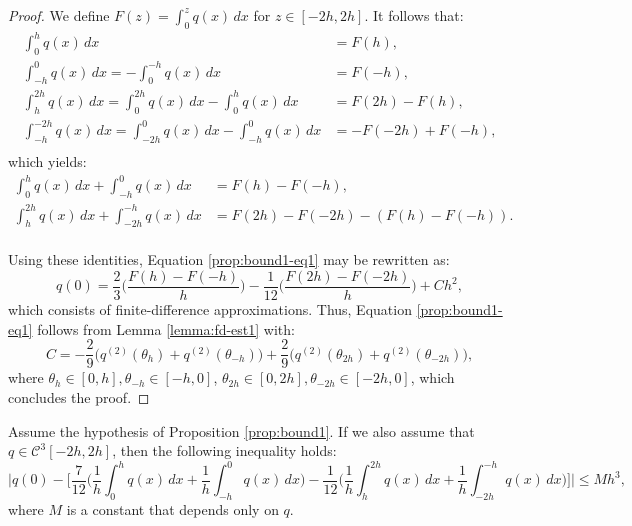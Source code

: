 \begin{proof}
	We define $F(z) = \int_{0}^{z} q(x) \,dx $ for $z \in [-2h, 2h]$. 
	It follows that:
	\begin{align*}
		\int_{ 0}^{h}   q(x) \,dx &= F(h),\\
		\int_{-h}^{0}   q(x) \,dx = -\int_{ 0}^{-h} q(x)  \,dx  &= F(-h),\\ 
		\int_{ h}^{2h}  q(x) \,dx =  \int_{ 0}^{2h} q(x)  \,dx - \int_{ 0}^{h} q(x) \,dx  &= F(2h) - F(h),\\ 
		\int_{-h}^{-2h} q(x) \,dx =  \int_{-2h }^{0} q(x) \,dx - \int_{-h}^{0} q(x) \,d x&= -F(-2h) + F(-h),\\ 
	\end{align*}
	which yields:
	\begin{align*}
		\int_{0}^{h} q(x) \,dx + \int_{-h}^{0} q(x) \,dx &=
		F(h) - F(-h), \\
		\int_{h}^{2h} q(x) \,dx + \int_{-2h}^{-h} q(x) \,dx &=
		F(2h) - F(-2h) - (F(h) - F(-h)). \\
	\end{align*}
	
	Using these identities, Equation \eqref{prop:bound1-eq1} may be rewritten as:
	\begin{equation}
		\label{prop:bound1-eq2}
		q(0) = \frac{2}{3} \bigg(\frac{F(h) - F(-h)}{h}\bigg)
		       - \frac{1}{12} \bigg(\frac{F(2h) - F(-2h)}{h}\bigg)
+ Ch^2,
	\end{equation}
	which consists of finite-difference approximations. 
	Thus, Equation \eqref{prop:bound1-eq1} follows from Lemma \ref{lemma:fd-est1}
	with:
	\begin{equation}
		\label{prop:bound1-eq3}
		C = -\frac{2}{9}\bigg( q^{(2)}(\theta_{h}) + q^{(2)}(\theta_{-h})\bigg)
		+ \frac{2}{9}\bigg( q^{(2)}(\theta_{2h}) + q^{(2)}(\theta_{-2h})\bigg), 
	\end{equation}
	where $\theta_{h} \in [0,h], \theta_{-h}\in [-h,0]$, 
	$\theta_{2h} \in [0,2h], \theta_{-2h}\in [-2h,0]$,
	which concludes the proof.

  \renewcommand\qedsymbol{} %
\end{proof}

\begin{prop}
	\label{prop:bound2}
	Assume the hypothesis of Proposition \ref{prop:bound1}. If we also assume that
	$q \in \mathcal{C}^{3}[-2h,2h]$, then the following inequality holds:
	\begin{equation}
                \label{prop:bound2-eq1}
		\bigg|q(0) - \bigg[\frac{7}{12}\bigg( \frac{1}{h} \int_{0}^{h} q(x) \,dx
                       + \frac{1}{h} \int_{-h}^{0} q(x) \,dx  \bigg)
                       - \frac{1}{12}\bigg( \frac{1}{h} \int_{h}^{2h} q(x) \,dx
		       + \frac{1}{h} \int_{-2h}^{-h} q(x) \,dx  \bigg) \bigg] \bigg|  \leq Mh^3,
        \end{equation}
        where $M$ is a constant that depends only on $q$.
\end{prop}

